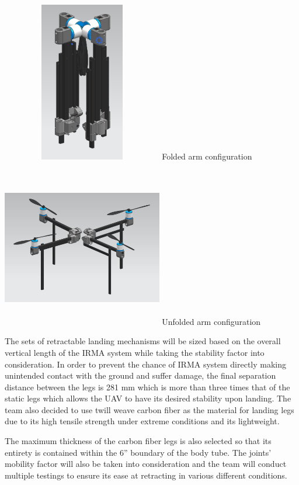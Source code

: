             \includegraphics[width = 7cm, height = 7cm]{img/PL/folded.PNG}
            Folded arm configuration

            \includegraphics[width = 7cm, height = 7cm]{img/PL/unfolded.PNG}
            Unfolded arm configuration

			The sets of retractable landing mechanisms will be sized based on the overall vertical length of the IRMA system while taking the stability factor into consideration. In order to prevent the chance of IRMA system directly making unintended contact with the ground and suffer damage, the final separation distance between the legs is 281 mm which is more than three times that of the static legs which allows the UAV to have its desired stability upon landing. The team also decided to use twill weave carbon fiber as the material for landing legs due to its high tensile strength under extreme conditions and its lightweight. 

            The maximum thickness of the carbon fiber legs is also selected so that its entirety is contained within the 6” boundary of the body tube. The joints’ mobility factor will also be taken into consideration and the team will conduct multiple testings to ensure its ease at retracting in various different conditions.


